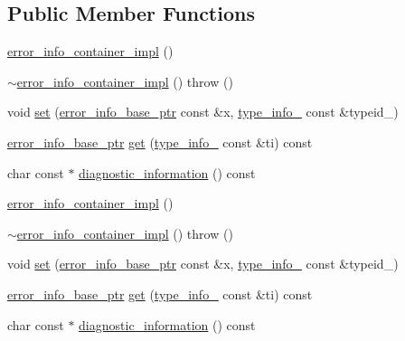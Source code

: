 \subsection*{Public Member Functions}
\begin{DoxyCompactItemize}
\item 
\hyperlink{classecto_1_1except_1_1error__info__container__impl_a258f844c2a2ee441c4e397971466f2c5}{error\-\_\-info\-\_\-container\-\_\-impl} ()
\item 
\hyperlink{classecto_1_1except_1_1error__info__container__impl_ab9391a11b1c7955810c184c07aec4858}{$\sim$error\-\_\-info\-\_\-container\-\_\-impl} ()  throw ()
\item 
void \hyperlink{classecto_1_1except_1_1error__info__container__impl_ac3931483b05bd3240a8ffe11c4977b99}{set} (\hyperlink{classecto_1_1except_1_1error__info__container__impl_a9fbca0758380cb123f790aee77d1d4d8}{error\-\_\-info\-\_\-base\-\_\-ptr} const \&x, \hyperlink{classecto_1_1except_1_1error__info__container__impl_abe4f51bf533842a5e0b81f3e43ae6267}{type\-\_\-info\-\_\-} const \&typeid\-\_\-)
\item 
\hyperlink{classecto_1_1except_1_1error__info__container__impl_a9fbca0758380cb123f790aee77d1d4d8}{error\-\_\-info\-\_\-base\-\_\-ptr} \hyperlink{classecto_1_1except_1_1error__info__container__impl_acab3219ea75b29048e2e4d8ad23028eb}{get} (\hyperlink{classecto_1_1except_1_1error__info__container__impl_abe4f51bf533842a5e0b81f3e43ae6267}{type\-\_\-info\-\_\-} const \&ti) const 
\item 
char const $\ast$ \hyperlink{classecto_1_1except_1_1error__info__container__impl_a9cd76f7d8bd75cdc5cf29061304a622a}{diagnostic\-\_\-information} () const 
\item 
\hyperlink{classecto_1_1except_1_1error__info__container__impl_a258f844c2a2ee441c4e397971466f2c5}{error\-\_\-info\-\_\-container\-\_\-impl} ()
\item 
\hyperlink{classecto_1_1except_1_1error__info__container__impl_ab9391a11b1c7955810c184c07aec4858}{$\sim$error\-\_\-info\-\_\-container\-\_\-impl} ()  throw ()
\item 
void \hyperlink{classecto_1_1except_1_1error__info__container__impl_ac3931483b05bd3240a8ffe11c4977b99}{set} (\hyperlink{classecto_1_1except_1_1error__info__container__impl_a9fbca0758380cb123f790aee77d1d4d8}{error\-\_\-info\-\_\-base\-\_\-ptr} const \&x, \hyperlink{classecto_1_1except_1_1error__info__container__impl_abe4f51bf533842a5e0b81f3e43ae6267}{type\-\_\-info\-\_\-} const \&typeid\-\_\-)
\item 
\hyperlink{classecto_1_1except_1_1error__info__container__impl_a9fbca0758380cb123f790aee77d1d4d8}{error\-\_\-info\-\_\-base\-\_\-ptr} \hyperlink{classecto_1_1except_1_1error__info__container__impl_acab3219ea75b29048e2e4d8ad23028eb}{get} (\hyperlink{classecto_1_1except_1_1error__info__container__impl_abe4f51bf533842a5e0b81f3e43ae6267}{type\-\_\-info\-\_\-} const \&ti) const 
\item 
char const $\ast$ \hyperlink{classecto_1_1except_1_1error__info__container__impl_a9cd76f7d8bd75cdc5cf29061304a622a}{diagnostic\-\_\-information} () const 
\end{DoxyCompactItemize}
